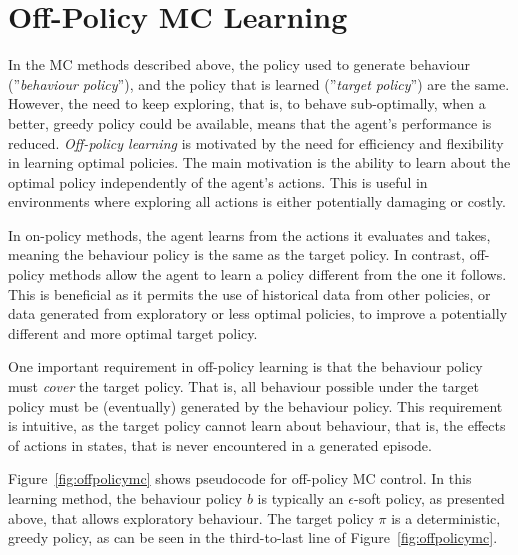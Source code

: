 \section{Off-Policy MC Learning}

In the MC methods described above, the policy used to generate behaviour (''\emph{behaviour policy}''), and the policy that is learned (''\emph{target policy}'') are the same. However, the need to keep exploring, that is, to behave sub-optimally, when a better, greedy policy could be available, means that the agent's performance is reduced. \emph{Off-policy learning} is motivated by the need for efficiency and flexibility in learning optimal policies. The main motivation is the ability to learn about the optimal policy independently of the agent's actions. This is useful in environments where exploring all actions is either potentially damaging or costly.

In on-policy methods, the agent learns from the actions it evaluates and takes, meaning the behaviour policy is the same as the target policy. In contrast, off-policy methods allow the agent to learn a policy different from the one it follows. This is beneficial as it permits the use of historical data from other policies, or data generated from exploratory or less optimal policies, to improve a potentially different and more optimal target policy. 

One important requirement in off-policy learning is that the behaviour policy must \emph{cover} the target policy. That is, all behaviour possible under the target policy must be (eventually) generated by the behaviour policy. This requirement is intuitive, as the target policy cannot learn about behaviour, that is, the effects of actions in states, that is never encountered in a generated episode.

Figure~\ref{fig:offpolicymc} shows pseudocode for off-policy MC control. In this learning method, the behaviour policy $b$ is typically an $\epsilon$-soft policy, as presented above, that allows exploratory behaviour. The target policy $\pi$ is a deterministic, greedy policy, as can be seen in the third-to-last line of Figure~\ref{fig:offpolicymc}.

